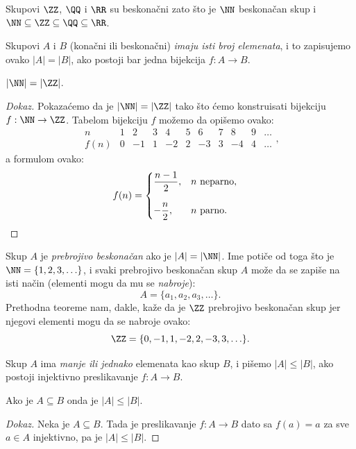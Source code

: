\begin{EX}
  Skupovi $\ZZ$, $\QQ$ i $\RR$ su beskona\v cni zato \v sto je $\NN$ beskona\v can skup i $\NN \subseteq \ZZ \subseteq \QQ \subseteq \RR$.
\end{EX}

\medskip

Skupovi $A$ i $B$ (kona\v cni ili beskona\v cni) \emph{imaju isti broj elemenata}, i to zapisujemo ovako $|A| = |B|$,
ako postoji bar jedna bijekcija $f : A \to B$.

\begin{THM}
  $|\NN| = |\ZZ|$.
\end{THM}
\begin{proof}[Dokaz]
  Pokaza\'cemo da je $|\NN| = |\ZZ|$ tako \v sto \'cemo konstruisati bijekciju $f : \NN \to \ZZ$. Tabelom bijekciju $f$
  mo\v zemo da opi\v semo ovako:
  $$
    \begin{array}{c|ccccccccccccccccc}
      n    & 1 & 2  & 3 & 4  & 5 & 6  & 7 & 8  & 9 & \ldots \\ \hline
      f(n) & 0 & -1 & 1 & -2 & 2 & -3 & 3 & -4 & 4 & \ldots
    \end{array},
  $$
  a formulom ovako:
  $$
    f(n) = \begin{cases}
      \displaystyle \frac{n-1}{2}, & n \text{\ neparno},\\[5mm]
      \displaystyle -\frac{n}{2},  & n \text{\ parno}.\qquad\qedhere
    \end{cases}
  $$
\end{proof}

Skup $A$ je \emph{prebrojivo beskona\v can} ako je $|A| = |\NN|$. Ime poti\v ce od toga \v sto je $\NN = \{1, 2, 3, \ldots\}$, i
svaki prebrojivo beskona\v can skup $A$ mo\v ze da se zapi\v se na isti na\v cin (elementi mogu da mu se \emph{nabroje}):
$$
  A = \{a_1, a_2, a_3, \ldots \}.
$$
Prethodna teoreme nam, dakle, ka\v ze da je $\ZZ$ prebrojivo beskona\v can skup jer njegovi elementi mogu da se nabroje ovako:
$$
  \ZZ = \{ 0, -1, 1, -2, 2, -3, 3, \ldots \}.
$$

Skup $A$ ima \emph{manje ili jednako} elemenata kao skup $B$, i pi\v semo $|A| \le |B|$, ako postoji injektivno
preslikavanje $f : A \to B$.

\begin{THM}
  Ako je $A \subseteq B$ onda je $|A| \le |B|$.
\end{THM}
\begin{proof}[Dokaz]
  Neka je $A \subseteq B$. Tada je preslikavanje $f : A \to B$ dato sa $f(a) = a$ za sve $a \in A$ injektivno,
  pa je $|A| \le |B|$.
\end{proof}

